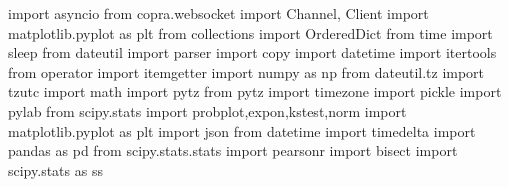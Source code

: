 import asyncio
from copra.websocket import Channel, Client
import matplotlib.pyplot as plt
from collections import OrderedDict
from time import sleep
from dateutil import parser
import copy
import datetime
import itertools
from operator import itemgetter
import numpy as np
from dateutil.tz import tzutc
import math
import pytz
from pytz import timezone
import pickle
import pylab
from scipy.stats import probplot,expon,kstest,norm
import matplotlib.pyplot as plt
import json
from datetime import timedelta
import pandas as pd
from scipy.stats.stats import pearsonr
import bisect
import scipy.stats as ss